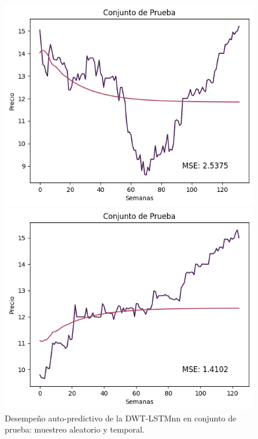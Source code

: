 \begin{figure}[H]
    \begin{minipage}{0.5\textwidth}
        \centering
        \includegraphics[width=\linewidth]{Figuras/proceso_de_entrenamiento/grafs_c_prueba/muestreo_aleatorio/DWT_LSTM/auto_predictiva/DWT_LSTM_rec.png}
    \end{minipage}
    \begin{minipage}{0.5\textwidth}
        \centering
        \includegraphics[width=\linewidth]{Figuras/proceso_de_entrenamiento/grafs_c_prueba/DWT_LSTM/auto_predictiva/DWT_LSTM_rec.png}
    \end{minipage}
    \caption{Desempeño auto-predictivo de la DWT-LSTMnn en conjunto de prueba: muestreo aleatorio y temporal.} 
    \label{fig:c_prueba_DWTLSTM_autopred_v2}
\end{figure}

